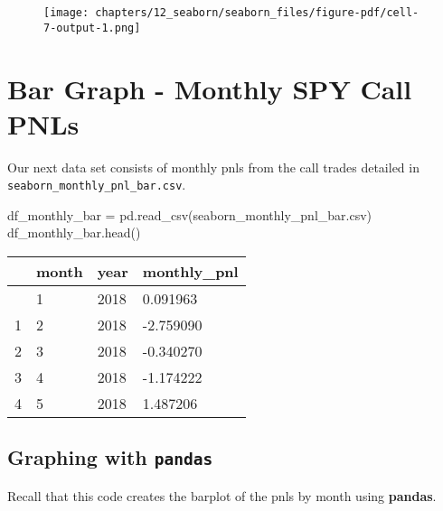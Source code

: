 \documentclass[
  letterpaper,
  DIV=11,
  numbers=noendperiod]{scrreprt}
\newenvironment{Shaded}{\begin{snugshade}}{\end{snugshade}}
\newcommand{\NormalTok}[1]{\textcolor[rgb]{0.00,0.23,0.31}{#1}}
\newcommand{\OperatorTok}[1]{\textcolor[rgb]{0.37,0.37,0.37}{#1}}
\newcommand{\StringTok}[1]{\textcolor[rgb]{0.13,0.47,0.30}{#1}}
\begin{document}
\begin{figure}[H]

{\centering \texttt{[image: chapters/12\_seaborn/seaborn\_files/figure-pdf/cell-7-output-1.png]}

}

\end{figure}

\hypertarget{bar-graph---monthly-spy-call-pnls}{%
\section{Bar Graph - Monthly SPY Call
PNLs}\label{bar-graph---monthly-spy-call-pnls}}

Our next data set consists of monthly pnls from the call trades detailed
in \texttt{seaborn\_monthly\_pnl\_bar.csv}.

\begin{Shaded}
\begin{Highlighting}[]
\NormalTok{df\_monthly\_bar }\OperatorTok{=}\NormalTok{ pd.read\_csv(}\StringTok{\textquotesingle{}seaborn\_monthly\_pnl\_bar.csv\textquotesingle{}}\NormalTok{)}
\NormalTok{df\_monthly\_bar.head()}
\end{Highlighting}
\end{Shaded}

\begin{longtable}[]{@{}llll@{}}
\toprule\noalign{}
& month & year & monthly\_pnl \\
\midrule\noalign{}
\endhead
\bottomrule\noalign{}
\endlastfoot
0 & 1 & 2018 & 0.091963 \\
1 & 2 & 2018 & -2.759090 \\
2 & 3 & 2018 & -0.340270 \\
3 & 4 & 2018 & -1.174222 \\
4 & 5 & 2018 & 1.487206 \\
\end{longtable}

\hypertarget{graphing-with-pandas-1}{%
\subsection{\texorpdfstring{Graphing with
\texttt{pandas}}{Graphing with pandas}}\label{graphing-with-pandas-1}}

Recall that this code creates the barplot of the pnls by month using
\textbf{pandas}.
\end{document}
